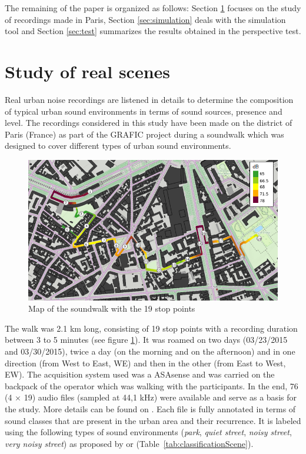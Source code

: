 \documentclass[11pt,letter]{article}
\begin{document}
The remaining of the paper is organized as follows: Section \ref{sec:study} focuses on the study of recordings made in Paris, Section \ref{sec:simulation} deals with the simulation tool and Section \ref{sec:test} summarizes the results obtained in the perspective test.


\section{Study of real scenes} \label{sec:study}
Real urban noise recordings are listened in details to determine the composition of typical urban sound environments in terms of sound sources, presence and level. The recordings considered in this study have been made on the  district of Paris (France) as part of the GRAFIC project \cite{aumond_sound_2016} during a soundwalk which was designed to cover different types of urban sound environments.\\ 

\begin{figure}[H]
\centering
\includegraphics[width=.5\textwidth]{./pictures/trajet_19pts.png}
\caption{Map of the soundwalk with the 19 stop points}
\label{fig:soundwalk}
\end{figure}

The walk was 2.1 km long, consisting of 19 stop points with a recording duration between 3 to 5 minutes (see figure \ref{fig:soundwalk}). It was roamed on two days (03/23/2015 and 03/30/2015), twice a day (on the morning and on the afternoon) and in one direction (from West to East, WE) and then in the other (from East to West, EW). The acquisition system used was a ASAsense and was carried on the backpack of the operator which was walking with the participants. In the end, 76 (4 $\times$ 19) audio files (sampled at 44,1 kHz) were available and serve as a basis for the study. More details can be found on \cite{aumond_modelling_2017}. Each file is fully annotated in terms of sound classes that are present in the urban area and their recurrence. It is labeled using the following types of sound environments (\textit{park}, \textit{quiet street}, \textit{noisy street}, \textit{very noisy street}) as proposed by \cite{rychtarikova_soundscape_2013} or \cite{can_describing_2015} (Table~\ref{tab:classificationScene}).
\end{document}
